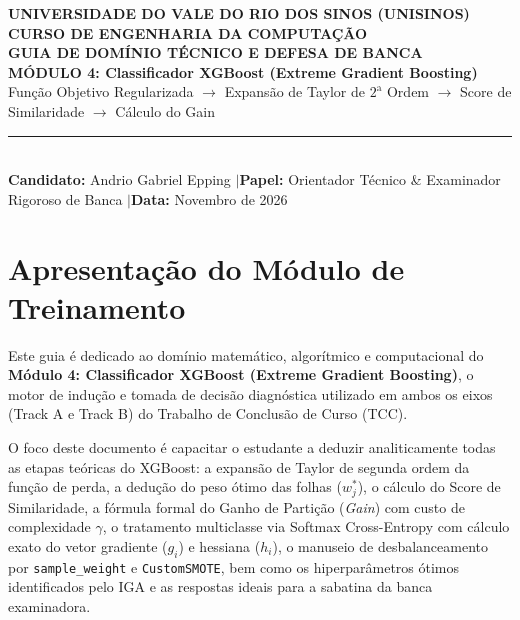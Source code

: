 \documentclass[11pt,a4paper]{article}
\begin{document}
\begin{center}
  {\large\textbf{\textsf{UNIVERSIDADE DO VALE DO RIO DOS SINOS (UNISINOS)}}}\\[0.2cm]
  {\normalsize\textbf{\textsf{CURSO DE ENGENHARIA DA COMPUTAÇÃO}}}\\[0.4cm]
  {\LARGE\textbf{\textcolor{NavyBlue}{\textsf{GUIA DE DOMÍNIO TÉCNICO E DEFESA DE BANCA}}}}\\[0.2cm]
  {\Large\textbf{\textsf{MÓDULO 4: Classificador XGBoost (Extreme Gradient Boosting)}}}\\[0.2cm]
  {\normalsize\textsf{Função Objetivo Regularizada $\longrightarrow$ Expansão de Taylor de $2^{\text{a}}$ Ordem $\longrightarrow$ Score de Similaridade $\longrightarrow$ Cálculo do Gain}}\\[0.4cm]
  \rule{\textwidth}{1pt}\\[0.2cm]
  \small\textbf{Candidato:} Andrio Gabriel Epping \quad$|$\quad \textbf{Papel:} Orientador Técnico \& Examinador Rigoroso de Banca \quad$|$\quad \textbf{Data:} Novembro de 2026
\end{center}
\vspace{0.3cm}

\section*{Apresentação do Módulo de Treinamento}
Este guia é dedicado ao domínio matemático, algorítmico e computacional do \textbf{Módulo 4: Classificador XGBoost (Extreme Gradient Boosting)}, o motor de indução e tomada de decisão diagnóstica utilizado em ambos os eixos (Track A e Track B) do Trabalho de Conclusão de Curso (TCC).

O foco deste documento é capacitar o estudante a deduzir analiticamente todas as etapas teóricas do XGBoost: a expansão de Taylor de segunda ordem da função de perda, a dedução do peso ótimo das folhas ($w_j^*$), o cálculo do Score de Similaridade, a fórmula formal do Ganho de Partição (\textit{Gain}) com custo de complexidade $\gamma$, o tratamento multiclasse via Softmax Cross-Entropy com cálculo exato do vetor gradiente ($g_i$) e hessiana ($h_i$), o manuseio de desbalanceamento por \texttt{sample\_weight} e \texttt{CustomSMOTE}, bem como os hiperparâmetros ótimos identificados pelo IGA e as respostas ideais para a sabatina da banca examinadora.
\end{document}
